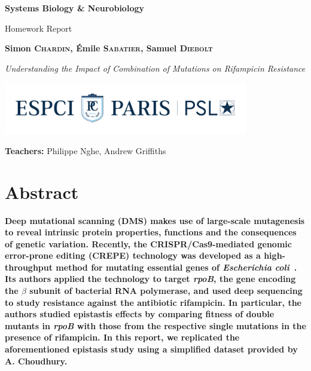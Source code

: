 \documentclass[12pt]{article}
\begin{document}
  \begin{titlepage}
    \begin{center}
      \vspace*{1cm}
 
      \Huge
      \textbf{Systems Biology \& Neurobiology}
 
      \vspace{0.5cm}
      \LARGE
      Homework Report
 
      \vspace{1.5cm}
 
      \Large\textbf{Simon \textsc{Chardin}, Émile \textsc{Sabatier}, Samuel
      \textsc{Diebolt}}

      \vfill 

      \textit{Understanding the Impact of Combination of Mutations on
      Rifampicin Resistance}
 
      \vfill 

      \includegraphics[width=0.8\textwidth]{espci_logo}
 
      \Large
      \textbf{Teachers:} Philippe Nghe, Andrew Griffiths
    \end{center}
    \thispagestyle{empty}
  \end{titlepage}


  \section{Abstract}

  \textbf{Deep mutational scanning (DMS) makes use of large-scale mutagenesis
  to reveal intrinsic protein properties, functions and the consequences of
  genetic variation. Recently, the CRISPR/Cas9-mediated genomic error-prone
  editing (CREPE) technology was developed as a high-throughput method for
  mutating essential genes of \textit{Escherichia coli}~\cite{choudhury2020}.
  Its authors applied the technology to target \textit{rpoB}, the gene encoding
  the $\beta$ subunit of bacterial RNA polymerase, and used deep sequencing to
  study resistance against the antibiotic rifampicin. In particular, the
  authors studied epistastis effects by comparing fitness of double mutants in
  \textit{rpoB} with those from the respective single mutations in the presence
  of rifampicin. In this report, we replicated the aforementioned epistasis
  study using a simplified dataset provided by A. Choudhury.}
\end{document}
